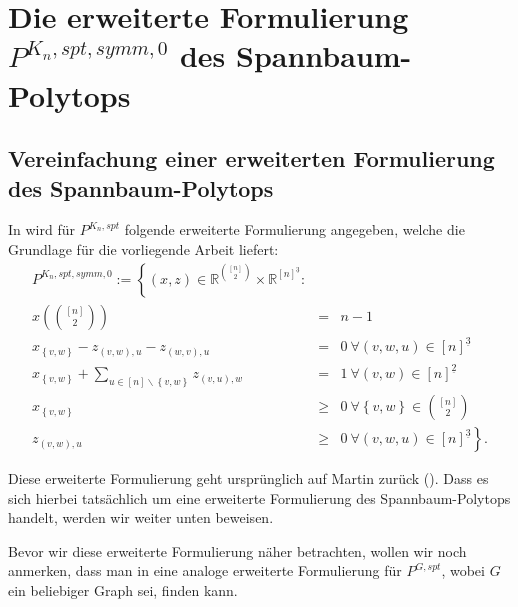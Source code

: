 \documentclass[10p,a4paper,BCOR = 12mm, DIV=15]{scrbook}
\begin{document}
\label{part:spannbaum_polytop}

\chapter{Die erweiterte Formulierung $P^{K_n, spt, symm, 0}$ des Spannbaum-Polytops}

\section{Vereinfachung einer erweiterten Formulierung des Spannbaum-Polytops}

In \cite{optima:ext_form_comb_opt} wird für $P^{K_n, spt}$ folgende erweiterte Formulierung angegeben, welche die Grundlage für die vorliegende Arbeit liefert:
\begin{eqnarray}
P^{K_n, spt, symm, 0} := \left\{(x, z)\in\mathbb{R}^{[n]\choose 2}\times \mathbb{R}^{[n]^{\underline{3}}}:\right. & & \nonumber \\
x\left({\left[n\right] \choose 2}\right) & = & n-1 \label{eq:spt1_redundant_1} \\
x_{\left\{v, w\right\}} - z_{\left(v, w\right), u} - z_{\left(w, v\right), u} & = & 0\ \forall \left(v, w, u\right)\in [n]^{\underline{3}} \label{eq:spt1_redundant_2} \\
x_{\left\{v, w\right\}} + \sum_{u\in[n]\backslash\left\{v, w\right\}} z_{\left(v, u\right), w} & = & 1\ \forall \left(v, w\right)\in [n]^{\underline{2}} \label{eq:spt1_3} \\
x_{\left\{v, w\right\}} & \geq & 0\ \forall \left\{v, w\right\}\in {[n] \choose 2} \nonumber \\
z_{\left(v, w\right), u} & \geq & \left. 0\ \forall \left(v, w, u\right)\in [n]^{\underline{3}} \nonumber \right\}.
\end{eqnarray}

Diese erweiterte Formulierung geht ursprünglich auf Martin zurück (\cite{Martin_extended_formulations}). Dass es sich hierbei tatsächlich um eine erweiterte Formulierung des Spannbaum-Polytops handelt, werden wir weiter unten beweisen.

Bevor wir diese erweiterte Formulierung näher betrachten, wollen wir noch anmerken, dass man in \cite{springerlink:ext_form_comb_opt} eine analoge erweiterte Formulierung für $P^{G, spt}$, wobei $G$ ein beliebiger Graph sei, finden kann.
\end{document}

